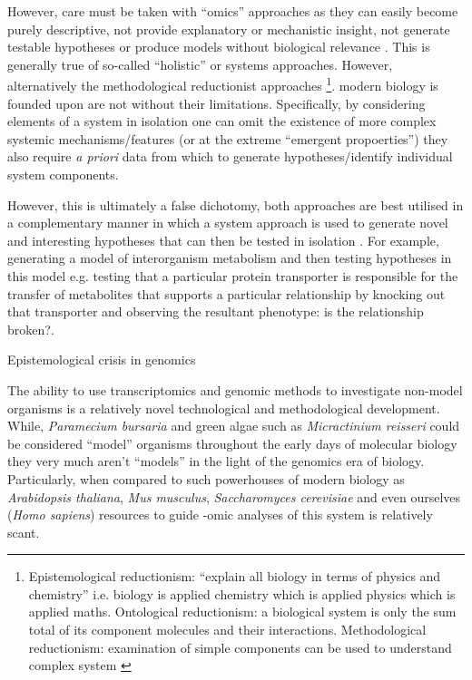 However, care must be taken with ``omics'' approaches as they can easily become purely descriptive,
not provide explanatory or mechanistic insight, not generate testable hypotheses or produce
models without biological relevance \citep{Fang2011}. This is generally true
of so-called ``holistic'' or systems approaches.  However, alternatively the methodological 
reductionist approaches
\footnote{
    Epistemological reductionism: ``explain all biology in terms of physics and chemistry'' \citep{Crick1966}
    i.e. biology is applied chemistry which is applied physics which is applied maths. 
    Ontological reductionism: a biological system is only the sum total of its component molecules and their
    interactions.
    Methodological reductionism: examination of simple components can be used to understand complex system \citep{Fang2011}}.
    modern biology is founded upon are not without their limitations.
Specifically, by considering elements of a system in isolation one can omit the existence of
more complex systemic mechanisms/features (or at the extreme ``emergent propoerties'') \citep{Fang2011} they also
require \textit{a priori} data from which to generate hypotheses/identify individual system components.

However, this is ultimately a false dichotomy, both approaches are best utilised in
a complementary manner in which a system approach is used to generate novel and interesting
hypotheses that can then be tested in isolation \citep{Casadevall2008}.  
For example, generating a model of interorganism metabolism and then testing
hypotheses in this model e.g. testing that a particular protein transporter is responsible
for the transfer of metabolites that supports a particular relationship by knocking out
that transporter and observing the resultant phenotype: is the relationship broken?.





Epistemological crisis in genomics \citep{Dougherty2008} %



The ability to use transcriptomics and genomic methods to investigate non-model
organisms is a relatively novel technological and methodological development. 
While, \textit{Paramecium bursaria} and green algae such as \textit{Micractinium
reisseri} could be considered ``model'' organisms throughout the early days of 
molecular biology they very much aren't ``models'' in the light of the genomics
era of biology.  Particularly, when compared to such powerhouses of modern biology
as \textit{Arabidopsis thaliana}, \textit{Mus musculus}, \textit{Saccharomyces
cerevisiae} and even ourselves (\textit{Homo sapiens}) resources to guide -omic
analyses of this system is relatively scant.


